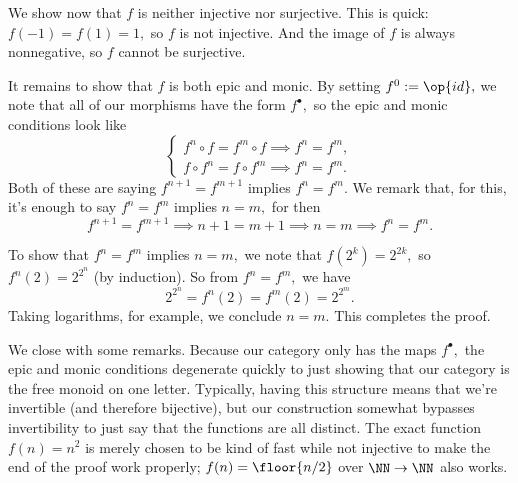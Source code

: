 We show now that $f$ is neither injective nor surjective. This is quick: $f(-1)=f(1)=1,$ so $f$ is not injective. And the image of $f$ is always nonnegative, so $f$ cannot be surjective.

It remains to show that $f$ is both epic and monic. By setting $f^0:=\op{id},$ we note that all of our morphisms have the form $f^\bullet,$ so the epic and monic conditions look like
\[\begin{cases}
    f^n\circ f=f^m\circ f\implies f^n=f^m, \\
    f\circ f^n=f\circ f^m\implies f^n=f^m.
\end{cases}\]
Both of these are saying $f^{n+1}=f^{m+1}$ implies $f^n=f^m.$ We remark that, for this, it's enough to say $f^n=f^m$ implies $n=m,$ for then
\[f^{n+1}=f^{m+1}\implies n+1=m+1\implies n=m\implies f^n=f^m.\]

To show that $f^n=f^m$ implies $n=m,$ we note that $f\left(2^k\right)=2^{2k},$ so $f^n(2)=2^{2^n}$ (by induction). So from $f^n=f^m,$ we have
\[2^{2^n}=f^n(2)=f^m(2)=2^{2^m}.\]
Taking logarithms, for example, we conclude $n=m.$ This completes the proof.

We close with some remarks. Because our category only has the maps $f^\bullet,$ the epic and monic conditions degenerate quickly to just showing that our category is the free monoid on one letter. Typically, having this structure means that we're invertible (and therefore bijective), but our construction somewhat bypasses invertibility to just say that the functions are all distinct. The exact function $f(n)=n^2$ is merely chosen to be kind of fast while not injective to make the end of the proof work properly; $f(n)=\floor{n/2}$ over $\NN\to\NN$ also works.

